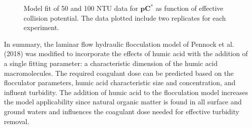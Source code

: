 \documentclass[letterpaper,10pt,english]{sphinxmanual}
\let\sphinxpxdimen\pdfpxdimen\else\newdimen\sphinxpxdimen
\begin{document}
\begin{figure}[htbp]
\centering
\capstart

\noindent\sphinxincludegraphics[width=400\sphinxpxdimen]{{Du_Fig8}.png}
\caption{Model fit of 50 and 100 NTU data for \(\boldsymbol{p}{\boldsymbol{C}}^{\boldsymbol{*}}\) as function of effective collision potential. The data plotted include two replicates for each experiment.}\label{\detokenize{Flocculation/Floc_Model:id50}}\label{\detokenize{Flocculation/Floc_Model:figure-du-fig8}}\end{figure}

In summary, the laminar flow hydraulic flocculation model of Pennock et al. (2018) was modified to incorporate the effects of humic acid with the addition of a single fitting parameter: a characteristic dimension of the humic acid macromolecules. The required coagulant dose can be predicted based on the flocculator parameters, humic acid characteristic size and concentration, and influent turbidity. The addition of humic acid to the flocculation model increases the model applicability since natural organic matter is found in all surface and ground waters and influences the coagulant dose needed for effective turbidity removal.
\end{document}
